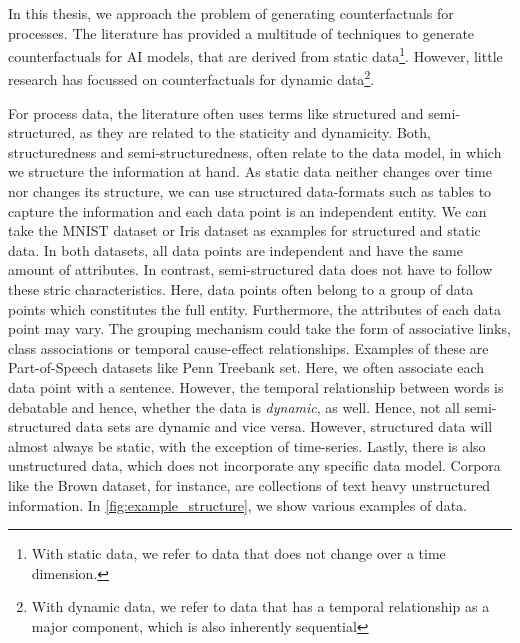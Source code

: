 \documentclass[./../../paper.tex]{subfiles}
\begin{document}
In this thesis, we approach the problem of generating counterfactuals for processes. The literature has provided a multitude of techniques to generate counterfactuals for AI models, that are derived from static data\footnote{With static data, we refer to data that does not change over a time dimension.}. However, little research has focussed on counterfactuals for dynamic data\footnote{With dynamic data, we refer to data that has a temporal relationship as a major component, which is also inherently sequential}.  

For process data, the literature often uses terms like structured and semi-structured, as they are related to the staticity and dynamicity. Both, structuredness and semi-structuredness, often relate to the data model, in which we structure the information at hand. As static data neither changes over time nor changes its structure, we can use structured data-formats such as tables to capture the information and each data point is an independent entity. We can take the MNIST dataset\autocite{deng_MNISTDatabaseHandwritten_2012} or Iris dataset\autocites{anderson_SpeciesProblemIris_1936,fisher_UseMultipleMeasurements_1936} as examples for structured and static data. In both datasets, all data points are independent and have the same amount of attributes. In contrast, semi-structured data does not have to follow these stric characteristics. Here, data points often belong to a group of data points which constitutes the full entity. Furthermore, the attributes of each data point may vary. The grouping mechanism could take the form of associative links, class associations or temporal cause-effect relationships. Examples of these are Part-of-Speech datasets like Penn Treebank set\autocite{marcus_Buildinglargeannotated_1993}. Here, we often associate each data point with a sentence. However, the temporal relationship between words is debatable and hence, whether the data is \emph{dynamic}, as well. Hence, not all semi-structured data sets are dynamic and vice versa. However, structured data will almost always be static, with the exception of time-series. Lastly, there is also unstructured data, which does not incorporate any specific data model. Corpora like the Brown dataset\autocite{francis79browncorpus}, for instance, are collections of text heavy unstructured information. In \autoref{fig:example_structure}, we show various examples of data.
\end{document}
